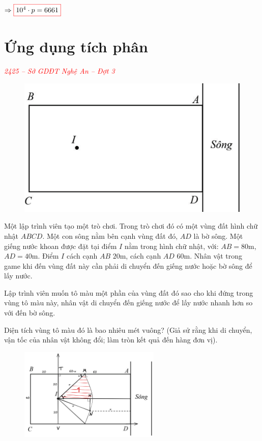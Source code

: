 \documentclass[twoside,final]{hcmut-report}
\newcommand{\exercise}[1]{\begin{exercisebox}#1\end{exercisebox}}
\newcommand{\result}[1]{\fcolorbox{red}{white}{#1}}
\begin{document}
$\Rightarrow \result{$10^4\cdot p = 6661$}$
\newpage\section{Ứng dụng tích phân}
\exercise{
    \textcolor{red}{\textit{2425 -- Sở GDĐT Nghệ An -- Đợt 3}}

    \begin{figure}
        \centering
        \includegraphics*[width=1.03\linewidth]{images/Nghệ An 2025 - Đợt 3/NgheAn25-5.png}
    \end{figure}

    Một lập trình viên tạo một trò chơi. Trong trò chơi đó có một vùng đất hình chữ nhật $ABCD$. Một con sông nằm bên cạnh vùng đất đó, $AD$ là bờ sông. Một giếng nước khoan được đặt tại điểm $I$ nằm trong hình chữ nhật, với:
    $AB = 80$m, $AD = 40$m. Điểm $I$ cách cạnh $AB$ $20$m, cách cạnh $AD$ $60$m. Nhân vật trong game khi đến vùng đất này cần phải di chuyển đến giếng nước hoặc bờ sông để lấy nước.

    Lập trình viên muốn tô màu một phần của vùng đất đó sao cho khi đứng trong vùng tô màu này, nhân vật di chuyển đến giếng nước để lấy nước nhanh hơn so với đến bờ sông.

    Diện tích vùng tô màu đó là bao nhiêu mét vuông? (Giả sử rằng khi di chuyển, vận tốc của nhân vật không đổi; làm tròn kết quả đến hàng đơn vị).
}
\begin{figure}[H]
    \centering
    \includegraphics[width=0.6\textwidth]{images/Nghệ An 2025 - Đợt 3/NgheAn25-6.png}
\end{figure}
\end{document}
